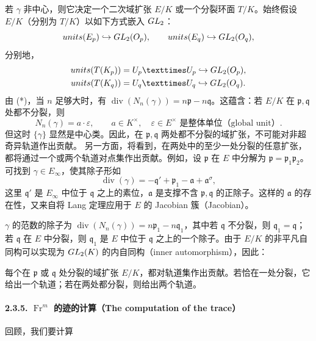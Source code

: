 若 $\gamma$ 非中心，则它决定一个二次域扩张 $E/K$ 或一个分裂环面 $T/K$。始终假设 $E/K$（分别为 $T/K$）以如下方式嵌入 $GL_2$：
\[
units(E_{p})\hookrightarrow GL_2(O_{p}),\qquad
units(E_{q})\hookrightarrow GL_2(O_{q}),
\]
分别地，
\[
\begin{aligned}
\operatorname{units}(T(K_{\mathfrak p}))&=U_{\mathfrak p}\times U_{\mathfrak p}
\hookrightarrow\GL_2(\mathcal O_{\mathfrak p}),\\
\operatorname{units}(T(K_{\mathfrak q}))&=U_{\mathfrak q}\times U_{\mathfrak q}
\hookrightarrow\GL_2(\mathcal O_{\mathfrak q}).
\end{aligned}
\]
由 (*)，当 $n$ 足够大时，有
$\operatorname{div}(N_n(\gamma))=n\mathfrak p-n\mathfrak q$。这蕴含：若 $E/K$ 在 $\mathfrak p,\mathfrak q$ 处都不分裂，则
\[
N_n(\gamma)=a\cdot\varepsilon,\qquad a\in K^\times,\quad
\varepsilon\in E^\times\text{ 是整体单位（global unit）}.
\]
但这时 $\{\gamma\}$ 显然是中心类。因此，在 $\mathfrak p,\mathfrak q$ 两处都不分裂的域扩张，不可能对非超奇异轨道作出贡献。
另一方面，将看到，在两处中的至少一处分裂的任意扩张，都将通过一个或两个轨道对点集作出贡献。例如，设 $\mathfrak p$ 在 $E$ 中分解为
$\mathfrak p=\mathfrak p_1\mathfrak p_2$。可找到 $\gamma\in E_\infty$，使其除子形如
\[
\operatorname{div}(\gamma)=-\mathfrak q'+\mathfrak p_1-\mathfrak a+\mathfrak a^\sigma,
\]
这里 $\mathfrak q'$ 是 $E_\infty$ 中位于 $\mathfrak q$ 之上的素位，$\mathfrak a$ 是支撑不含 $\mathfrak p,\mathfrak q$ 的正除子。这样的 $\mathfrak a$ 的存在性，又来自将 Lang 定理应用于 $E$ 的 Jacobian 簇（Jacobian）。

$\gamma$ 的范数的除子为
$\operatorname{div}(N_n(\gamma))=n\mathfrak p_1-n\mathfrak q_1$，其中若 $\mathfrak q$ 不分裂，则 $\mathfrak q_1=\mathfrak q$；若 $\mathfrak q$ 在 $E$ 中分裂，则 $\mathfrak q_1$ 是 $E$ 中位于 $\mathfrak q$ 之上的一个除子。由于 $E/K$ 的非平凡自同构可以实现为 $GL_2(K)$ 的内自同构（inner automorphism），因此：

每个在 $\mathfrak p$ 或 $\mathfrak q$ 处分裂的域扩张 $E/K$，都对轨道集作出贡献。若恰在一处分裂，它给出一个轨道；若在两处都分裂，则给出两个轨道。
\paragraph*{2.3.5. $\operatorname{Fr}^m$ 的迹的计算（The computation of the trace）}
回顾，我们要计算

